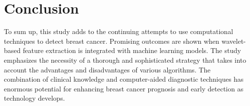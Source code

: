 \section{Conclusion}
To sum up, this study adds to the continuing attempts to use computational techniques to detect breast cancer. Promising outcomes are shown when wavelet-based feature extraction is integrated with machine learning models. The study emphasizes the necessity of a thorough and sophisticated strategy that takes into account the advantages and disadvantages of various algorithms. The combination of clinical knowledge and computer-aided diagnostic techniques has enormous potential for enhancing breast cancer prognosis and early detection as technology develops.